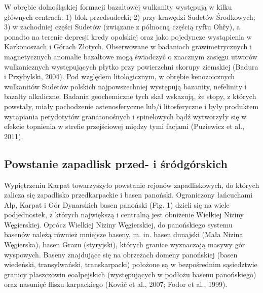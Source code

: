 \documentclass[11.5pt,twoside]{report}
\begin{document}
W obrębie dolnośląskiej formacji bazaltowej wulkanity występują w kilku głównych centrach: 1) blok przedsudecki; 2) przy krawędzi Sudetów Środkowych; 3) w zachodniej części Sudetów (związane z północną częścią ryftu Oh\v{r}y), a ponadto na terenie depresji kredy opolskiej oraz jako pojedyncze wystąpienia w Karkonoszach i Górach Złotych. Obserwowane w badaniach grawimetrycznych i magnetycznych anomalie bazaltowe mogą świadczyć o znacznym zasięgu utworów wulkanicznych występujących płytko przy powierzchni skorupy ziemskiej (Badura i Przybylski, 2004). Pod względem litologicznym, w obrębie kenozoicznych wulkanitów Sudetów polskich najpowszechniej występują bazanity, nefelinity i bazalty alkaliczne. Badania geochemiczne tych skał wskazują, że stopy, z których powstały, miały pochodzenie astenosferyczne lub/i litosferyczne i były produktem wytapiania perydotytów granatonośnych i spinelowych bąd\'{z} wytworzyły się w efekcie topnienia w strefie przejściowej między tymi facjami (Puziewicz et al., 2011).


  

	
	\subsection{Powstanie zapadlisk przed- i śródgórskich}
	
Wypiętrzeniu Karpat towarzyszyło powstanie rejonów zapadliskowych, do których zalicza się zapadlisko przedkarpackie i basen panoński. Ograniczony łańcuchami Alp, Karpat i Gór Dynarskich basen panoński (Fig. 1) dzieli się na wiele podjednostek, z których największą i centralną jest obniżenie Wielkiej Niziny Węgierskiej. Oprócz Wielkiej Niziny Węgierskiej, do panońskiego systemu basenów należą również mniejsze baseny, m. in. basen dunajski (Mała Nizina Węgierska), basen Grazu (styryjski), których granice wyznaczają masywy gór wyspowych. Baseny znajdujące się na obrzeżach domeny panońskiej (basen wiedeński, transylwański, transkarpacki) położone są w bezpośrednim sąsiedztwie granicy płaszczowin eoalpejskich (występujących w podłożu basenu panońskiego) oraz nasunięć fliszu karpackiego (Kováč et al., 2007; Fodor et al., 1999).
\end{document}
